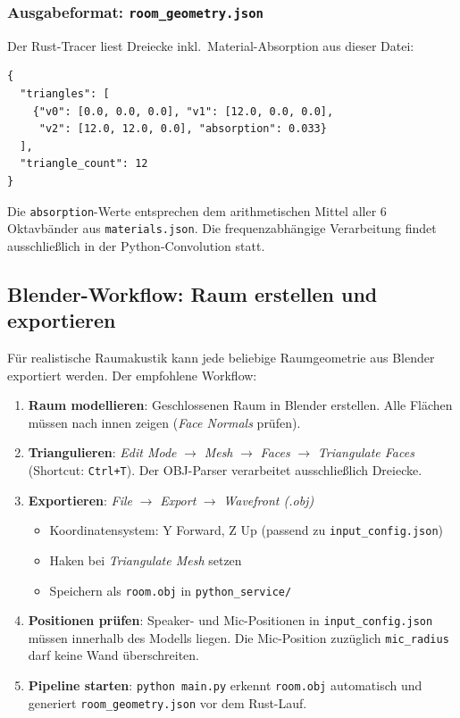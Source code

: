 \subsubsection{Ausgabeformat: \texttt{room\_geometry.json}}

Der Rust-Tracer liest Dreiecke inkl.\ Material-Absorption aus dieser Datei:

\begin{lstlisting}[language={}]
{
  "triangles": [
    {"v0": [0.0, 0.0, 0.0], "v1": [12.0, 0.0, 0.0],
     "v2": [12.0, 12.0, 0.0], "absorption": 0.033}
  ],
  "triangle_count": 12
}
\end{lstlisting}

Die \texttt{absorption}-Werte entsprechen dem arithmetischen Mittel aller 6 Oktavb\"ander
aus \texttt{materials.json}. Die frequenzabh\"angige Verarbeitung findet ausschlie\ss{}lich
in der Python-Convolution statt.

\subsection{Blender-Workflow: Raum erstellen und exportieren}

F\"ur realistische Raumakustik kann jede beliebige Raumgeometrie aus Blender
exportiert werden. Der empfohlene Workflow:

\begin{enumerate}
    \item \textbf{Raum modellieren}: Geschlossenen Raum in Blender erstellen.
    Alle Fl\"achen m\"ussen nach innen zeigen (\textit{Face Normals} pr\"ufen).
    \item \textbf{Triangulieren}: \textit{Edit Mode} $\to$ \textit{Mesh} $\to$
    \textit{Faces} $\to$ \textit{Triangulate Faces} (Shortcut: \texttt{Ctrl+T}).
    Der OBJ-Parser verarbeitet ausschlie\ss{}lich Dreiecke.
    \item \textbf{Exportieren}: \textit{File} $\to$ \textit{Export} $\to$
    \textit{Wavefront (.obj)}
    \begin{itemize}
        \item Koordinatensystem: Y Forward, Z Up (passend zu \texttt{input\_config.json})
        \item Haken bei \textit{Triangulate Mesh} setzen
        \item Speichern als \texttt{room.obj} in \texttt{python\_service/}
    \end{itemize}
    \item \textbf{Positionen pr\"ufen}: Speaker- und Mic-Positionen in
    \texttt{input\_config.json} m\"ussen innerhalb des Modells liegen.
    Die Mic-Position zuz\"uglich \texttt{mic\_radius} darf keine Wand \"uberschreiten.
    \item \textbf{Pipeline starten}: \texttt{python main.py} erkennt \texttt{room.obj}
    automatisch und generiert \texttt{room\_geometry.json} vor dem Rust-Lauf.
\end{enumerate}

